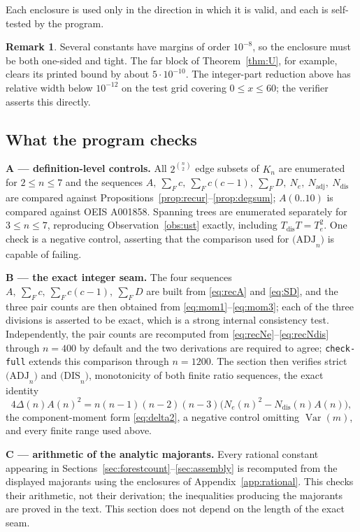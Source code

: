 \documentclass[11pt,a4paper]{amsart}
\theoremstyle{plain}
\theoremstyle{definition}
\newtheorem{remark}[theorem]{Remark}
\newcommand{\Var}{\operatorname{Var}}
\newcommand{\Nc}{N}
\newcommand{\ADJ}{\mathrm{(ADJ}_n\mathrm{)}}
\newcommand{\DIS}{\mathrm{(DIS}_n\mathrm{)}}
\begin{document}
Each enclosure is used only in the direction in which it is valid, and each is
self-tested by the program.

\begin{remark}\label{rem:tightness}
Several constants have margins of order $10^{-8}$, so the enclosure must be both
one-sided and tight. The far block of Theorem~\ref{thm:U}, for example, clears
its printed bound by about $5\cdot10^{-10}$. The integer-part reduction above
has relative width below $10^{-12}$ on the test grid covering $0\le x\le60$;
the verifier asserts this directly.
\end{remark}

\subsection{What the program checks}

\textbf{A --- definition-level controls.} All $2^{\binom{n}{2}}$ edge subsets of
$K_n$ are enumerated for $2 \le n \le 7$ and the sequences
$A,\ \sum_F c,\ \sum_F c(c-1),\ \sum_F D,\ \Nc_e,\ \Nc_{\mathrm{adj}},\
\Nc_{\mathrm{dis}}$ are compared against
Propositions~\ref{prop:recur}--\ref{prop:degsum}; $A(0..10)$ is compared against
OEIS A001858. Spanning trees are enumerated separately for $3 \le n \le 7$,
reproducing Observation~\ref{obs:ust} exactly, including
$T_{\mathrm{dis}}T = T_e^2$. One check is a negative control, asserting that the
comparison used for $\ADJ$ is capable of failing.

\textbf{B --- the exact integer seam.} The four sequences
$A,\ \sum_F c,\ \sum_F c(c-1),\ \sum_F D$ are built from \eqref{eq:recA} and
\eqref{eq:SD}, and the three pair counts are then obtained from
\eqref{eq:mom1}--\eqref{eq:mom3}; each of the three divisions is asserted to be
exact, which is a strong internal consistency test. Independently, the pair
counts are recomputed from \eqref{eq:recNe}--\eqref{eq:recNdis} through $n=400$
by default and the two derivations are required to agree; \texttt{check-full}
extends this comparison through $n=1200$. The section then verifies strict
$\ADJ$ and $\DIS$, monotonicity of both finite ratio sequences, the exact identity
\[
  4\Delta(n)A(n)^2
  =n(n-1)(n-2)(n-3)\bigl(\Nc_e(n)^2-\Nc_{\mathrm{dis}}(n)A(n)\bigr),
\]
the component-moment form \eqref{eq:delta2}, a negative control omitting
$\Var(m)$, and every finite range used above.

\textbf{C --- arithmetic of the analytic majorants.} Every rational constant
appearing in Sections~\ref{sec:forestcount}--\ref{sec:assembly} is recomputed
from the displayed majorants using the enclosures of
Appendix~\ref{app:rational}. This checks their arithmetic, not their derivation;
the inequalities producing the majorants are proved in the text. This section
does not depend on the length of the exact seam.
\end{document}
